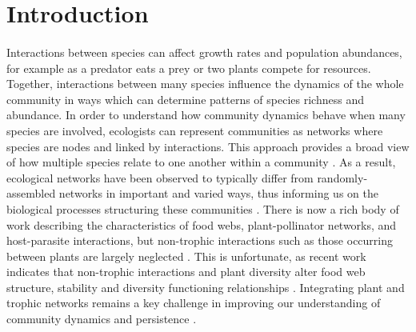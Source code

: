 \documentclass[a4,12pt]{article}
\begin{document}
\section{Introduction}
    
    \paragraph{}
    Interactions between species can affect growth rates and population abundances, for example as a predator eats a prey or two plants compete for resources. Together, interactions between many species influence the dynamics of the whole community in ways which can determine patterns of species richness and abundance. In order to understand how community dynamics behave when many species are involved, ecologists can represent communities as networks \citep{Pimm1978} where species are nodes and linked by interactions. This approach provides a broad view of how multiple species relate to one another within a community \citep{Kefi2015}. As a result, ecological networks have been observed to typically differ from randomly-assembled networks in important and varied ways, thus informing us on the biological processes structuring these communities \citep{Dunne2002}. There is now a rich body of work describing the characteristics of food webs, plant-pollinator networks, and host-parasite interactions, but non-trophic interactions such as those occurring between plants are largely neglected \citep{Ellison2019}. This is unfortunate, as recent work indicates that non-trophic interactions and plant diversity alter food web structure, stability and diversity functioning relationships \citep{Hammill2015, Giling2019, Zhao2019, Miele2019}. Integrating plant and trophic networks remains a key challenge in improving our understanding of community dynamics and persistence \citep{Godoy2018c}. 
\end{document}
